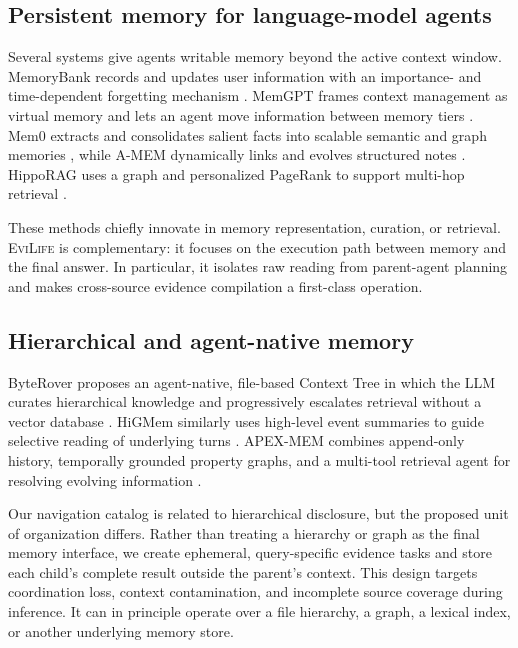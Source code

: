 \documentclass{article}
\newcommand{\method}{\textsc{EviLife}}
\begin{document}
\subsection{Persistent memory for language-model agents}

Several systems give agents writable memory beyond the active context window.
MemoryBank records and updates user information with an importance- and
time-dependent forgetting mechanism \citep{zhong2023memorybank}. MemGPT frames
context management as virtual memory and lets an agent move information between
memory tiers \citep{packer2023memgpt}. Mem0 extracts and consolidates salient
facts into scalable semantic and graph memories \citep{chhikara2025mem0}, while
A-MEM dynamically links and evolves structured notes
\citep{xu2025amem}. HippoRAG uses a graph and personalized PageRank to support
multi-hop retrieval \citep{gutierrez2024hipporag}.

These methods chiefly innovate in memory representation, curation, or retrieval.
\method{} is complementary: it focuses on the execution path between memory and
the final answer. In particular, it isolates raw reading from parent-agent
planning and makes cross-source evidence compilation a first-class operation.

\subsection{Hierarchical and agent-native memory}

ByteRover proposes an agent-native, file-based Context Tree in which the LLM
curates hierarchical knowledge and progressively escalates retrieval without a
vector database \citep{nguyen2026byterover}. HiGMem similarly uses high-level
event summaries to guide selective reading of underlying turns
\citep{cao2026higmem}. APEX-MEM combines append-only history, temporally grounded
property graphs, and a multi-tool retrieval agent for resolving evolving
information \citep{banerjee2026apex}.

Our navigation catalog is related to hierarchical disclosure, but the proposed
unit of organization differs. Rather than treating a hierarchy or graph as the
final memory interface, we create ephemeral, query-specific evidence tasks and
store each child's complete result outside the parent's context. This design
targets coordination loss, context contamination, and incomplete source
coverage during inference. It can in principle operate over a file hierarchy,
a graph, a lexical index, or another underlying memory store.
\end{document}
